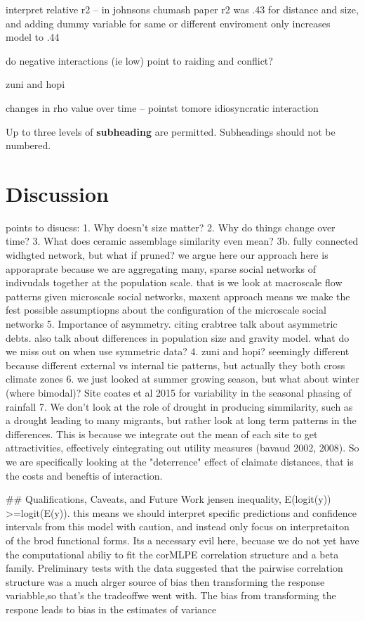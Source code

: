 \documentclass[fleqn,10pt]{wlscirep}
\begin{document}
interpret relative r2 -- in johnsons chumash paper r2 was .43 for distance and size, and adding dummy variable for same or different enviroment only increases model to .44

do negative interactions (ie low) point to raiding and conflict?

zuni and hopi

changes in rho value over time -- pointst tomore idiosyncratic interaction

Up to three levels of \textbf{subheading} are permitted. Subheadings should not be numbered.

\section*{Discussion}


points to disucss:
1. Why doesn't size matter?
2. Why do things change over time?
3. What does ceramic assemblage similarity even mean?
3b. fully connected widhgted network, but what if pruned?
  we argue here our approach here is apporaprate because we are aggregating many, sparse social networks of indivudals together at the population scale. that is we look at macroscale flow patterns given microscale social networks, maxent approach means we make the fest possible assumptiopns about the configuration of the microscale social networks
5. Importance of asymmetry. citing crabtree talk about asymmetric debts. also talk about differences in population size and gravity model. what do we miss out on when use symmetric data?
4. zuni and hopi? seemingly different because different external vs internal tie patterns, but actually they both cross climate zones
6. we just looked at summer growing season, but what about winter (where bimodal)? Site coates et al 2015 for variability in the seasonal phasing of rainfall
7. We don't look at the role of drought in producing simmilarity, such as a drought leading to many migrants, but rather look at long term patterns in the differences. This is because we integrate out the mean of each site to get attractivities, effectively eintegrating out utility measures (bavaud 2002, 2008). So we are specifically looking at the "deterrence" effect of claimate distances, that is the costs and beneftis of interaction.

## Qualifications, Caveats, and Future Work
jensen inequality, E(logit(y)) >=logit(E(y)). this means we should interpret specific predictions and confidence intervals from this model with caution, and instead only focus on interpretaiton of the brod functional forms. Its a necessary evil here, becuase we do not yet have the computational abiliy to fit the corMLPE correlation structure and a beta family. Preliminary tests with the data suggested that the pairwise correlation structure was a much alrger source of bias then transforming the response variabble,so that's the tradeoffwe went with. The bias from transforming the respone leads to bias in the estimates of variance
\end{document}
